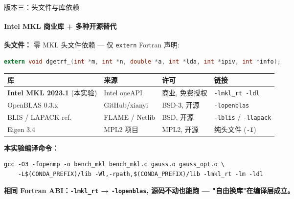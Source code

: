 \documentclass[12pt,aspectratio=169]{beamer}
\begin{document}
\begin{frame}{版本三：头文件与库依赖}
\framesubtitle{Intel MKL 商业库 + 多种开源替代}

\textbf{头文件：} 零 MKL 头文件依赖 — 仅 \texttt{extern} Fortran 声明:
\begin{lstlisting}[language=C,basicstyle=\ttfamily\scriptsize,belowskip=-2pt,aboveskip=0pt,numbers=none]
extern void dgetrf_(int *m, int *n, double *a, int *lda, int *ipiv, int *info);
\end{lstlisting}

\vspace{4pt}
\footnotesize
\begin{center}
\renewcommand{\arraystretch}{1.1}
\setlength{\tabcolsep}{4pt}
\begin{tabular}{@{}l l l l@{}}
\toprule
\textbf{库} & \textbf{来源} & \textbf{许可} & \textbf{链接} \\
\midrule
\textbf{Intel MKL 2023.1} (本实验) & Intel oneAPI & 商业, 免费授权 & \texttt{-lmkl\_rt -ldl} \\
OpenBLAS 0.3.x         & GitHub/xianyi   & BSD-3, 开源 & \texttt{-lopenblas} \\
BLIS / LAPACK ref.     & FLAME / Netlib  & BSD, 开源    & \texttt{-lblis} / \texttt{-llapack} \\
Eigen 3.4              & MPL2 项目       & MPL2, 开源   & 纯头文件 (\texttt{-I}) \\
\bottomrule
\end{tabular}
\end{center}
\normalsize

\vspace{2pt}
\textbf{本实验编译命令：}
\begin{lstlisting}[basicstyle=\ttfamily\scriptsize,belowskip=-2pt,aboveskip=0pt,numbers=none]
gcc -O3 -fopenmp -o bench_mkl bench_mkl.c gauss.o gauss_opt.o \
    -L$(CONDA_PREFIX)/lib -Wl,-rpath,$(CONDA_PREFIX)/lib -lmkl_rt -lm -ldl
\end{lstlisting}

\vspace{2pt}
\begin{center}
\small \textbf{相同 Fortran ABI：\texttt{-lmkl\_rt} → \texttt{-lopenblas}, 源码不动也能跑 — "自由换库"在编译层成立。}
\end{center}
\end{frame}
\end{document}

